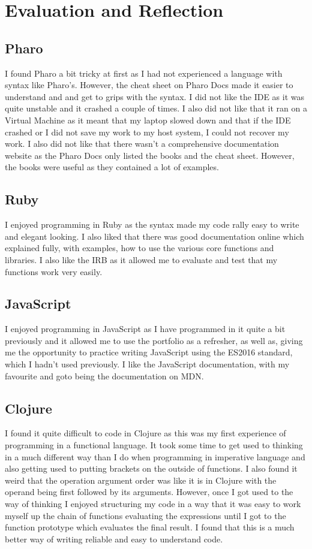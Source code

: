 \section*{Evaluation and Reflection}
\subsection*{Pharo}
I found Pharo a bit tricky at first as I had not experienced a language with syntax like Pharo's. However, the cheat sheet on Pharo Docs made it easier to understand and and get to grips with the syntax. I did not like the IDE as it was quite unstable and it crashed a couple of times. I also did not like that it ran on a Virtual Machine as it meant that my laptop slowed down and that if the IDE crashed or I did not save my work to my host system, I could not recover my work. I also did not like that there wasn't a comprehensive documentation website as the Pharo Docs only listed the books and the cheat sheet. However, the books were useful as they contained a lot of examples.
\subsection*{Ruby}
I enjoyed programming in Ruby as the syntax made my code rally easy to write and elegant looking. I also liked that there was good documentation online which explained fully, with examples, how to use the various core functions and libraries. I also like the IRB as it allowed me to evaluate and test that my functions work very easily.
\subsection*{JavaScript}
I enjoyed programming in JavaScript as I have programmed in it quite a bit previously and it allowed me to use the portfolio as a refresher, as well as, giving me the opportunity to practice writing JavaScript using the ES2016 standard, which I hadn't used previously. I like the JavaScript documentation, with my favourite and goto being the documentation on MDN.
\subsection*{Clojure}
I found it quite difficult to code in Clojure as this was my first experience of programming in a functional language. It took some time to get used to thinking in a much different way than I do when programming in imperative language and also getting used to putting brackets on the outside of functions. I also found it weird that the operation argument order was like it is in Clojure with the operand being first followed by its arguments. However, once I got used to the way of thinking I enjoyed structuring my code in a way that it was easy to work myself up the chain of functions evaluating the expressions until I got to the function prototype which evaluates the final result. I found that this is a much better way of writing reliable and easy to understand code.
